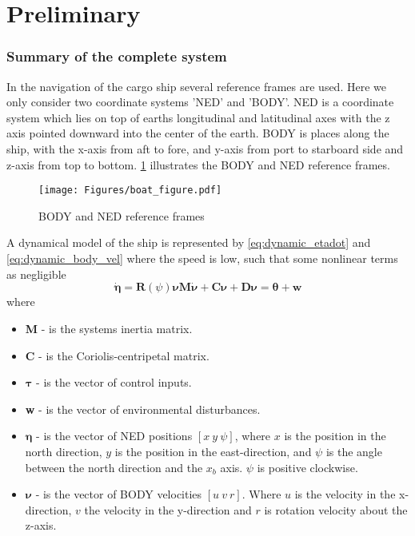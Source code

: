 \section*{Preliminary}\label{sec:preliminary}

\subsubsection*{Summary of the complete system}
In the navigation of the cargo ship several reference frames are used. Here we only consider two coordinate systems 'NED' and 'BODY'. NED is a coordinate system which lies on top of earths longitudinal and latitudinal axes with the z axis pointed downward into the center of the earth. BODY is places along the ship, with the x-axis from aft to fore, and y-axis from port to starboard side and z-axis from top to bottom. \cref{fig:boat_coordsys} illustrates the BODY and NED reference frames.
\begin{figure}[H]
    \centering
    \texttt{[image: Figures/boat\_figure.pdf]}
    \caption{BODY and NED reference frames}
    \label{fig:boat_coordsys}
\end{figure}
A dynamical model of the ship is represented by \cref{eq:dynamic_etadot} and \cref{eq:dynamic_body_vel} where the speed is low, such that some nonlinear terms as negligible
\begin{subequations}
    \begin{equation} \label{eq:dynamic_etadot}
        \dot{\boldsymbol{\eta}} = \boldsymbol{R}(\psi)\boldsymbol{\nu}
    \end{equation} 
    \begin{equation} \label{eq:dynamic_body_vel}
        \boldsymbol{M\dot{\nu} + C\nu + D\nu = \theta} + \textbf{w}
    \end{equation}
\end{subequations}
where
\begin{itemize}
    \item \textbf{M} - is the systems inertia matrix.
    \item \textbf{C} - is the Coriolis-centripetal matrix.
    \item $\boldsymbol{\tau}$ - is the vector of control inputs.
    \item \textbf{w} - is the vector of environmental disturbances.
    \item $\boldsymbol{\eta}$ - is the vector of NED positions $[x \ y \ \psi]$, where $x$ is the position in the north direction, $y$ is the position in the east-direction, and $\psi$  is the angle between the north direction and the $x_b$ axis. $\psi$ is positive clockwise.
    \item $\boldsymbol{\nu}$ - is the vector of BODY velocities $[u \ v \ r]$. Where $u$ is the velocity in the x-direction, $v$ the velocity in the y-direction and $r$ is rotation velocity about the z-axis.
\end{itemize}
